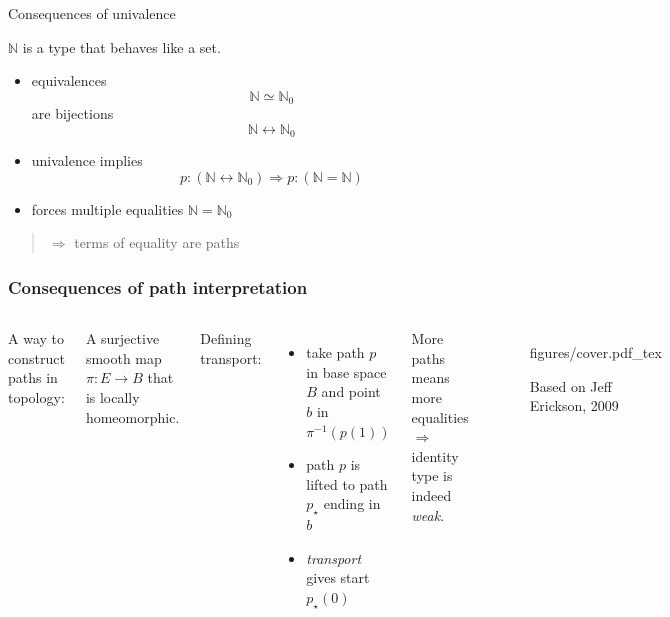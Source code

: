 \documentclass[english,handout]{beamer}
\newcommand{\incfig}[1]{%
    \def\svgwidth{\columnwidth}
    {#1.pdf_tex}
}
\newcommand{\fig}[2]{
    \begin{figure}\begin{center}\texttt{[image: figures/\#1]}\caption{#2\label{#1}}\end{center}
    \end{figure}}
\newcommand{\tcol}[2]{
    \begin{columns}
        \column{.5\textwidth}
        #1
        \column{.5\textwidth}
        #2
    \end{columns}
}
\begin{document}
\begin{frame}{Consequences of univalence}

\begin{example}
$\mathbb{N}$ is a type that behaves like a set.
\begin{itemize}
    \item equivalences \[\mathbb{N} \simeq \mathbb{N}_0 \] are bijections \[\mathbb{N} \leftrightarrow \mathbb{N}_0 \]
    \item univalence implies \[ p : (\mathbb{N} \leftrightarrow \mathbb{N}_0 ) \Rightarrow p : (\mathbb{N} = \mathbb{N})\]

    \item forces multiple equalities $\mathbb{N} = \mathbb{N}_0$
\end{itemize}
\end{example}

\pause

\begin{quotation}
$\Rightarrow$ terms of equality are paths
\end{quotation}




\end{frame}



\begin{frame}[fragile]
    \frametitle{Consequences of path interpretation}
     
     
     
     
     \tcol{
        A way to construct paths in topology:
        \begin{definition}[Covering]
         A surjective smooth map $\pi : E \rightarrow B$ that is locally homeomorphic.
        \end{definition}

        
        Defining transport:
        \begin{itemize}
            \item take path $p$ in base space $B$ and point $b$ in $\pi^{-1}(p(1))$
            \item path $p$ is lifted to path $p_\star$ ending in $b$
            \item \emph{transport} gives start $p_\star(0)$
        \end{itemize}
        
        More paths means more equalities
        $\Rightarrow$ identity type is indeed \emph{weak}.
        
     }
     {
        \begin{figure}
        \incfig{figures/cover}
        \caption{Based on Jeff Erickson, 2009}
        \end{figure}
     }     
\end{frame}
    
\end{document}
